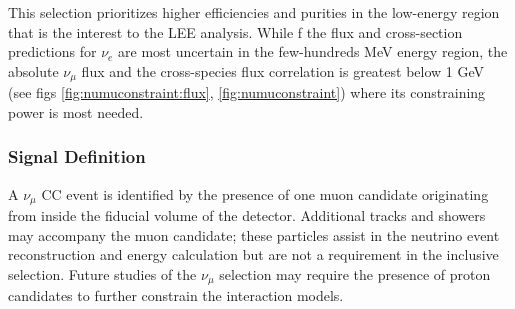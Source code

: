 \par This selection prioritizes higher efficiencies and purities in the low-energy region that is the interest to the LEE analysis. While f the flux and cross-section predictions for $\nu_{e}$ are most uncertain in the few-hundreds MeV energy region, the absolute $\nu_{\mu}$ flux and the cross-species flux correlation is greatest below 1 GeV (see figs \ref{fig:numuconstraint:flux}, \ref{fig:numuconstraint}) where its constraining power is most needed.

\subsubsection{Signal Definition}
\label{sssec:NuMUCCsel:constr:signaldef}
\par A $\nu_{\mu}$ CC event is identified by the presence of one muon candidate originating from inside the fiducial volume of the detector. Additional tracks and showers may accompany the muon candidate; these particles assist in the neutrino event reconstruction and energy calculation but are not a requirement in the inclusive selection. Future studies of the $\nu_{\mu}$ selection may require the presence of proton candidates to further constrain the interaction models.

